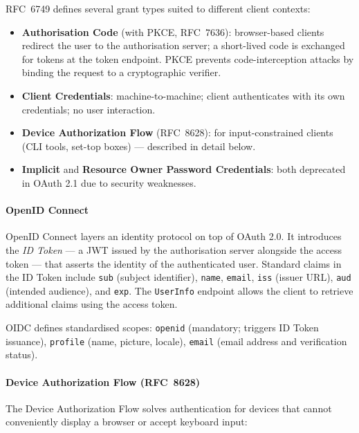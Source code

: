 RFC~6749 defines several grant types suited to different client contexts:
\begin{itemize}
    \item \textbf{Authorisation Code} (with PKCE, RFC~7636): browser-based clients redirect the user to the authorisation server; a short-lived code is exchanged for tokens at the token endpoint. PKCE prevents code-interception attacks by binding the request to a cryptographic verifier.
    \item \textbf{Client Credentials}: machine-to-machine; client authenticates with its own credentials; no user interaction.
    \item \textbf{Device Authorization Flow} (RFC~8628): for input-constrained clients (CLI tools, set-top boxes) — described in detail below.
    \item \textbf{Implicit} and \textbf{Resource Owner Password Credentials}: both deprecated in OAuth 2.1 due to security weaknesses.
\end{itemize}

\paragraph{OpenID Connect}

OpenID Connect layers an identity protocol on top of OAuth 2.0. It introduces the \emph{ID Token} — a JWT issued by the authorisation server alongside the access token — that asserts the identity of the authenticated user. Standard claims in the ID Token include \texttt{sub} (subject identifier), \texttt{name}, \texttt{email}, \texttt{iss} (issuer URL), \texttt{aud} (intended audience), and \texttt{exp}. The \texttt{UserInfo} endpoint allows the client to retrieve additional claims using the access token.

OIDC defines standardised scopes: \texttt{openid} (mandatory; triggers ID Token issuance), \texttt{profile} (name, picture, locale), \texttt{email} (email address and verification status).

\paragraph{Device Authorization Flow (RFC~8628)}

The Device Authorization Flow solves authentication for devices that cannot conveniently display a browser or accept keyboard input:

